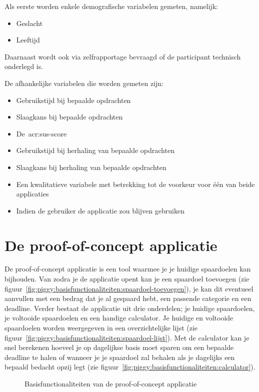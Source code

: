 Als eerste worden enkele demografische variabelen gemeten, namelijk:
\begin{itemize}
    \item Geslacht
    \item Leeftijd
\end{itemize}
Daarnaast wordt ook via zelfrapportage bevraagd of de participant technisch onderlegd is.

De afhankelijke variabelen die worden gemeten zijn:
\begin{itemize}
    \item Gebruikstijd bij bepaalde opdrachten
    \item Slaagkans bij bepaalde opdrachten
    \item De~\acrshort{acr:sus}-score
    \item Gebruikstijd bij herhaling van bepaalde opdrachten
    \item Slaagkans bij herhaling van bepaalde opdrachten
    \item Een kwalitatieve variabele met betrekking tot de voorkeur voor één van beide applicaties
    \item Indien de gebruiker de applicatie zou blijven gebruiken
\end{itemize}

\section{De proof-of-concept applicatie}
\label{sec:applicatie}

De proof-of-concept applicatie is een tool waarmee je je huidige spaardoelen kan bijhouden. Van zodra je de applicatie opent kan je een spaardoel toevoegen (zie figuur~\ref{fig:piggy:basisfunctionaliteiten:spaardoel-toevoegen}), je kan dit eventueel aanvullen met een bedrag dat je al gespaard hebt, een passende categorie en een deadline. Verder bestaat de applicatie uit drie onderdelen; je huidige spaardoelen, je voltooide spaardoelen en een handige calculator. Je huidige en voltooide spaardoelen worden weergegeven in een overzichtelijke lijst (zie figuur~\ref{fig:piggy:basisfunctionaliteiten:spaardoel-lijst}). Met de calculator kan je snel berekenen hoeveel je op dagelijkse basis moet sparen om een bepaalde deadline te halen of wanneer je je spaardoel zal behalen als je dagelijks een bepaald bedacht opzij legt (zie figuur~\ref{fig:piggy:basisfunctionaliteiten:calculator}).

\begin{figure}[h!]
    \centering
    \qquad
    \qquad
    \caption{Basisfunctionaliteiten van de proof-of-concept applicatie}
    \label{fig:piggy:basisfunctionaliteiten}
\end{figure}

